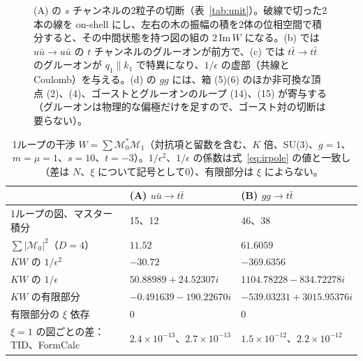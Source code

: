 \documentclass[a4paper,10pt]{ltjsarticle}
\begin{document}
\begin{figure}[tbp]
\caption{(A) の $s$ チャンネルの2粒子の切断（表~\ref{tab:unit}）。破線で切った2本の線を on-shell にし、左右の木の振幅の積を2体の位相空間で積分すると、その中間状態を持つ図の組の $2\,\mathrm{Im}\,W$ になる。(b) では $u\bar u\to u\bar u$ の $t$ チャンネルのグルーオンが前方で、(c) では $t\bar t\to t\bar t$ のグルーオンが $q_1\parallel k_1$ で特異になり、$1/\epsilon$ の虚部（共線と Coulomb）を与える。(d) の $gg$ には、箱 (5)(6) のほか非可換な頂点 (2)、(4)、ゴーストとグルーオンのループ (14)、(15) が寄与する（グルーオンは物理的な偏極だけを足すので、ゴースト対の切断は要らない）。}
\label{fig:cuts}
\end{figure}

\begin{table}[tbp]
\centering\small
\caption{1ループの干渉 $W=\sum\mathcal M_0^*\mathcal M_1$（対抗項と留数を含む、$K$ 倍、SU(3)、$g=1$、$m=\mu=1$、$s=10$、$t=-3$）。$1/\epsilon^2$、$1/\epsilon$ の係数は式~\eqref{eq:irpole} の値と一致し（差は $N$、$\xi$ について記号として0）、有限部分は $\xi$ によらない。}
\label{tab:scat}
\begin{tabular}{lll}
\toprule
 & (A) $u\bar u\to t\bar t$ & (B) $gg\to t\bar t$ \\
\midrule
1ループの図、マスター積分 & 15、12 & 46、38 \\
$\sum|\mathcal M_0|^2$（$D=4$） & $11.52$ & $61.6059$ \\
$KW$ の $1/\epsilon^2$ & $-30.72$ & $-369.6356$ \\
$KW$ の $1/\epsilon$ & $50.88989+24.52307i$ & $1104.78228-834.72278i$ \\
$KW$ の有限部分 & $-0.491639-190.22670i$ & $-539.03231+3015.95376i$ \\
有限部分の $\xi$ 依存 & 0 & 0 \\
$\xi=1$ の図ごとの差：TID、FormCalc & $2.4\times10^{-13}$、$2.7\times10^{-13}$ & $1.5\times10^{-12}$、$2.2\times10^{-12}$ \\
\bottomrule
\end{tabular}
\end{table}
\end{document}
